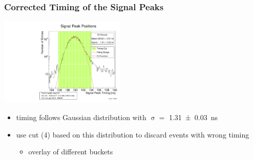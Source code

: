 \documentclass[9pt]{beamer}
\begin{document}
\begin{frame}
	\frametitle{Corrected Timing of the Signal Peaks}
	\vspace*{-20pt}
	\begin{center}
		\includegraphics[angle=270, width=6cm]{SigPeakPos}\\
	\end{center}
	\begin{itemize}
		\item timing follows Gaussian distribution with $\upsigma=$ \SI[separate-uncertainty = true]{1.31\pm.03}{ns}
		\item use cut (\SI{4}{\upsigma}) based on this distribution to discard events with wrong timing 
		\begin{itemize}
			\item overlay of different buckets
		\end{itemize}
	\end{itemize}
\end{frame}
\end{document}
